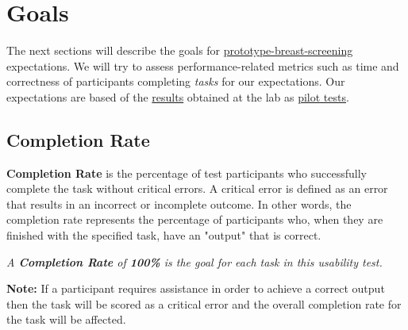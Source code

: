 \section{Goals}

The next sections will describe the goals for \hyperlink{https://github.com/MIMBCD-UI/prototype-breast-screening/}{prototype-breast-screening} expectations. We will try to assess performance-related metrics such as time and correctness of participants completing \textit{tasks} for our expectations. Our expectations are based of the \hyperlink{https://docs.google.com/spreadsheets/d/1WwbvDO5Iz39Jr6H2ZzPth1o9DqhmpQz10Vtao7rvjfQ/edit?usp=sharing}{results} obtained at the lab as \hyperlink{https://www.nngroup.com/articles/pilot-testing/}{pilot tests}.


\subsection{Completion Rate}

\textbf{Completion Rate} is the percentage of test participants who successfully complete the task without critical errors. A critical error is defined as an error that results in an incorrect or incomplete outcome. In other words, the completion rate represents the percentage of participants who, when they are finished with the specified task, have an "output" that is correct.


\hfill

\textit{A \textbf{Completion Rate} of \textbf{100\%} is the goal for each task in this usability test.}

\hfill



\hfill

\textbf{Note:} If a participant requires assistance in order to achieve a correct output then the task will be scored as a critical error and the overall completion rate for the task will be affected.

\hfill

